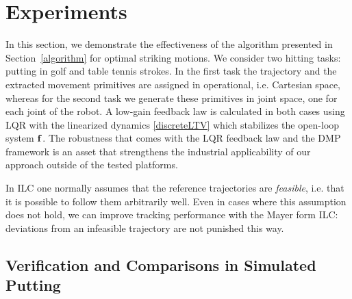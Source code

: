\section{Experiments}\label{experiments}


In this section, we demonstrate the effectiveness of the algorithm presented in Section~\ref{algorithm} for optimal striking motions. We consider two hitting tasks: putting in golf and table tennis strokes. In the first task the trajectory and the extracted movement primitives are assigned in operational, i.e. Cartesian space, whereas for the second task we generate these primitives in joint space, one for each joint of the robot. A low-gain feedback law is calculated in both cases using LQR with the linearized dynamics \eqref{discreteLTV} which stabilizes the open-loop system $\boldsymbol{\mathrm{f}}$. The robustness that comes with the LQR feedback law and the DMP framework is an asset that strengthens the industrial applicability of our approach outside of the tested platforms.

In ILC one normally assumes that the reference trajectories are \emph{feasible}, i.e. that it is possible to follow them arbitrarily well. Even in cases where this assumption does not hold, we can improve tracking performance with the Mayer form ILC: deviations from an infeasible trajectory are not punished this way.

\subsection{Verification and Comparisons in Simulated Putting}


